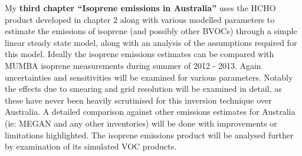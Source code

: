     My \textbf{third chapter ``Isoprene emissions in Australia''} uses the HCHO product developed in chapter 2 along with various modelled parameters to estimate the emissions of isoprene (and possibly other BVOCs) through a simple linear steady state model, along with an analysis of the assumptions required for this model.
    Ideally the isoprene emissions estimates can be compared with MUMBA isoprene measurements during summer of 2012 - 2013.
    Again uncertainties and sensitivities will be examined for various parameters.
    Notably the effects due to smearing and grid resolution will be examined in detail, as these have never been heavily scrutinised for this inversion technique over Australia.
    A detailed comparison against other emissions estimates for Australia (ie: MEGAN and any other inventories) will be done with improvements or limitations highlighted.
    The isoprene emissions product will be analysed further by examination of its simulated VOC products.
  
%       
%       

